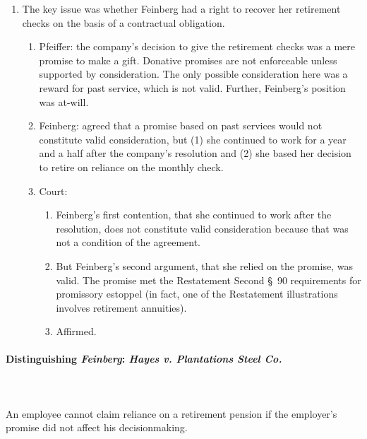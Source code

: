 \begin{enumerate}
    \item The key issue was whether Feinberg had a right to recover her 
    retirement checks on the basis of a contractual 
    obligation.
    \begin{enumerate}
        \item Pfeiffer: the company's decision to give the retirement checks 
        was a mere promise to make a gift. Donative promises are not 
        enforceable unless supported by consideration. The only possible 
        consideration here was a reward for past service, which is not valid. 
        Further, Feinberg's position was at-will.
        \item Feinberg: agreed that a promise based on past services would not 
        constitute valid consideration, but (1) she continued to work for a 
        year and a half after the company's resolution and (2) she based her 
        decision to retire on reliance on the monthly check.
        \item Court: 
        \begin{enumerate}
            \item Feinberg's first contention, that she continued to work 
            after the resolution, does not constitute valid consideration 
            because that was not a condition of the agreement.
            \item But Feinberg's second argument, that she relied on the 
            promise, was valid. The promise met the Restatement Second \S\ 90 
            requirements for promissory estoppel (in fact, one of the 
            Restatement illustrations involves retirement annuities).
            \item Affirmed.
        \end{enumerate}
    \end{enumerate}
\end{enumerate}

\paragraph{Distinguishing \emph{Feinberg}: \emph{Hayes v. Plantations 
Steel Co.}}
~\\\\
An employee cannot claim reliance on a retirement pension if the employer's 
promise did not affect his decisionmaking.

